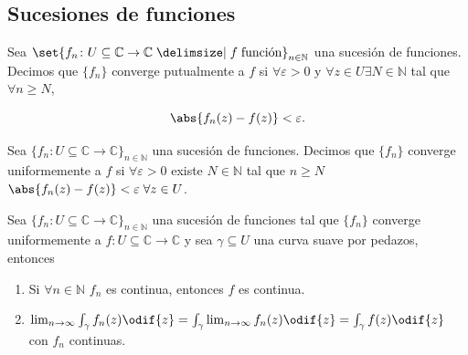 \documentclass[../main.tex]{subfiles}
\begin{document}
\subsection{Sucesiones de funciones}

\begin{definition}
    Sea \(\set{f_{n} \colon U \subseteq \mathbb{C} \to \mathbb{C} \given f\;
    \text{función}}_{n\in \mathbb{N}}\) una sucesión de funciones. Decimos que
    \(\{f_{n}\}\) converge putualmente a \(f\) si \(\forall \varepsilon > 0\) y
    \(\forall z\in U \exists N\in \mathbb{N}\) tal que \(\forall n \geq N\),

    \begin{equation*}
        \abs{f_{n}(z) - f(z)} < \varepsilon.
    \end{equation*}
\end{definition}

\begin{definition}
    Sea \(\{f_{n} \colon U \subseteq \mathbb{C} \to \mathbb{C}\}_{n\in \mathbb{N}}\) una
    sucesión de funciones. Decimos que \(\{f_{n}\}\) converge uniformemente a \(f\) si
    \(\forall \varepsilon > 0\) existe \(N\in \mathbb{N}\) tal que \(n \geq N\)
    \(\abs{f_{n}(z) - f(z)} < \varepsilon\; \forall z\in U\).
\end{definition}

\begin{proposition}\label{prop:convergenciaLimit}
    Sea \(\{f_{n} \colon U \subseteq \mathbb{C} \to \mathbb{C}\}_{n\in \mathbb{N}}\) una
    sucesión de funciones tal que \(\{f_{n}\}\) converge uniformemente a \(f \colon U
    \subseteq \mathbb{C} \to \mathbb{C}\) y sea \(\gamma \subseteq U\) una curva suave
    por pedazos, entonces

    \begin{enumerate}
        \item Si \(\forall n\in \mathbb{N}\) \(f_{n}\) es continua, entonces
            \(f\) es continua.
        \item \(\lim_{n \to \infty} \int_{\gamma}^{}f_{n}(z)\odif{z} =
                \int_{\gamma}^{}\lim_{n \to \infty} f_{n}(z)\odif{z} =
            \int_{\gamma}^{}f(z)\odif{z}\) con \(f_{n}\) continuas.
    \end{enumerate}
\end{proposition}
\end{document}

